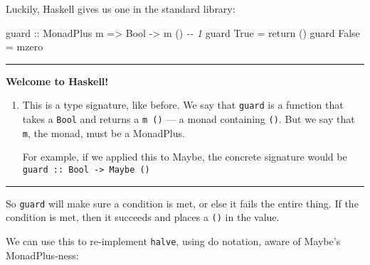 \documentclass[]{article}
\newenvironment{Shaded}{}{}
\newcommand{\CommentTok}[1]{\textcolor[rgb]{0.38,0.63,0.69}{\textit{#1}}}
\newcommand{\DataTypeTok}[1]{\textcolor[rgb]{0.56,0.13,0.00}{#1}}
\newcommand{\DecValTok}[1]{\textcolor[rgb]{0.25,0.63,0.44}{#1}}
\newcommand{\FunctionTok}[1]{\textcolor[rgb]{0.02,0.16,0.49}{#1}}
\newcommand{\KeywordTok}[1]{\textcolor[rgb]{0.00,0.44,0.13}{\textbf{#1}}}
\newcommand{\NormalTok}[1]{#1}
\newcommand{\OperatorTok}[1]{\textcolor[rgb]{0.40,0.40,0.40}{#1}}
\newcommand{\OtherTok}[1]{\textcolor[rgb]{0.00,0.44,0.13}{#1}}
\begin{document}
Luckily, Haskell gives us one in the standard library:

\begin{Shaded}
\begin{Highlighting}[]
\OtherTok{guard ::} \DataTypeTok{MonadPlus}\NormalTok{ m }\OtherTok{=\textgreater{}} \DataTypeTok{Bool} \OtherTok{{-}\textgreater{}}\NormalTok{ m ()        }\CommentTok{{-}{-} 1}
\NormalTok{guard }\DataTypeTok{True}  \OtherTok{=} \FunctionTok{return}\NormalTok{ ()}
\NormalTok{guard }\DataTypeTok{False} \OtherTok{=}\NormalTok{ mzero}
\end{Highlighting}
\end{Shaded}

\begin{center}\rule{0.5\linewidth}{0.5pt}\end{center}

\textbf{Welcome to Haskell!}

\begin{enumerate}
\def\labelenumi{\arabic{enumi}.}
\item
  This is a type signature, like before. We say that \texttt{guard} is a
  function that takes a \texttt{Bool} and returns a \texttt{m\ ()} --- a monad
  containing \texttt{()}. But we say that \texttt{m}, the monad, must be a
  MonadPlus.

  For example, if we applied this to Maybe, the concrete signature would be
  \texttt{guard\ ::\ Bool\ -\textgreater{}\ Maybe\ ()}
\end{enumerate}

\begin{center}\rule{0.5\linewidth}{0.5pt}\end{center}

So \texttt{guard} will make sure a condition is met, or else it fails the entire
thing. If the condition is met, then it succeeds and places a \texttt{()} in the
value.

We can use this to re-implement \texttt{halve}, using do notation, aware of
Maybe's MonadPlus-ness:

\begin{Shaded}
\end{Shaded}
\end{document}
